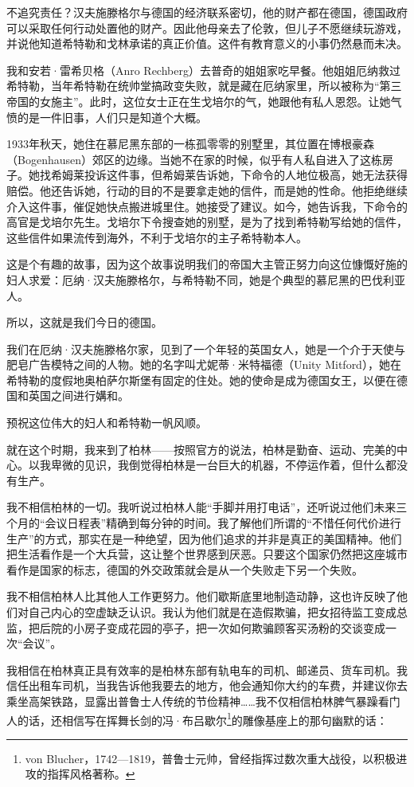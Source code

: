 \documentclass[UTF8]{ctexart}
\begin{document}
不追究责任？汉夫施滕格尔与德国的经济联系密切，他的财产都在德国，德国政府可以采取任何行动处置他的财产。因此他母亲去了伦敦，但儿子不愿继续玩游戏，并说他知道希特勒和戈林承诺的真正价值。这件有教育意义的小事仍然悬而未决。

我和安若·雷希贝格（Anro Rechberg）去普奇的姐姐家吃早餐。他姐姐厄纳救过希特勒，当年希特勒在统帅堂搞政变失败，就是藏在厄纳家里，所以被称为“第三帝国的女施主”。此时，这位女士正在生戈培尔的气，她跟他有私人恩怨。让她气愤的是一件旧事，人们只是知道个大概。

1933年秋天，她住在慕尼黑东部的一栋孤零零的别墅里，其位置在博根豪森（Bogenhausen）郊区的边缘。当她不在家的时候，似乎有人私自进入了这栋房子。她找希姆莱投诉这件事，但希姆莱告诉她，下命令的人地位极高，她无法获得赔偿。他还告诉她，行动的目的不是要拿走她的信件，而是她的性命。他拒绝继续介入这件事，催促她快点搬进城里住。她接受了建议。如今，她告诉我，下命令的高官是戈培尔先生。戈培尔下令搜查她的别墅，是为了找到希特勒写给她的信件，这些信件如果流传到海外，不利于戈培尔的主子希特勒本人。

这是个有趣的故事，因为这个故事说明我们的帝国大主管正努力向这位慷慨好施的妇人求爱：厄纳·汉夫施滕格尔，与希特勒不同，她是个典型的慕尼黑的巴伐利亚人。

所以，这就是我们今日的德国。

我们在厄纳·汉夫施滕格尔家，见到了一个年轻的英国女人，她是一个介于天使与肥皂广告模特之间的人物。她的名字叫尤妮蒂·米特福德（Unity Mitford），她在希特勒的度假地奥柏萨尔斯堡有固定的住处。她的使命是成为德国女王，以便在德国和英国之间进行媾和。

预祝这位伟大的妇人和希特勒一帆风顺。

就在这个时期，我来到了柏林——按照官方的说法，柏林是勤奋、运动、完美的中心。以我卑微的见识，我倒觉得柏林是一台巨大的机器，不停运作着，但什么都没有生产。

我不相信柏林的一切。我听说过柏林人能“手脚并用打电话”，还听说过他们未来三个月的“会议日程表”精确到每分钟的时间。我了解他们所谓的“不惜任何代价进行生产”的方式，那实在是一种绝望，因为他们追求的并非是真正的美国精神。他们把生活看作是一个大兵营，这让整个世界感到厌恶。只要这个国家仍然把这座城市看作是国家的标志，德国的外交政策就会是从一个失败走下另一个失败。

我不相信柏林人比其他人工作更努力。他们歇斯底里地制造动静，这也许反映了他们对自己内心的空虚缺乏认识。我认为他们就是在造假欺骗，把女招待监工变成总监，把后院的小房子变成花园的亭子，把一次如何欺骗顾客买汤粉的交谈变成一次“会议”。

我相信在柏林真正具有效率的是柏林东部有轨电车的司机、邮递员、货车司机。我信任出租车司机，当我告诉他我要去的地方，他会通知你大约的车费，并建议你去乘坐高架铁路，显露出普鲁士人传统的节俭精神……我不仅相信柏林脾气暴躁看门人的话，还相信写在挥舞长剑的冯·布吕歇尔\footnote{von Blucher，1742—1819，普鲁士元帅，曾经指挥过数次重大战役，以积极进攻的指挥风格著称。}的雕像基座上的那句幽默的话：
\end{document}

